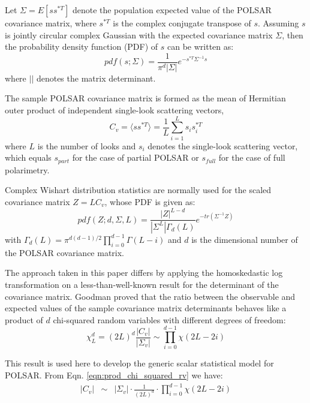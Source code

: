 \documentclass[journal]{IEEEtran}
\begin{document}
Let $\Sigma=E [ss^{*T}]$ denote the population expected value of the POLSAR covariance matrix,
  where $s^{*T}$ is the complex conjugate transpose of $s$. 
Assuming %
  $s$ is jointly circular complex Gaussian with the expected covariance matrix $\Sigma$,
  then the probability density function (PDF) of $s$ can be written as:
\begin{equation}
  pdf(s;\Sigma)=\frac{1}{\pi^d|\Sigma|} e^{-s^{*T}\Sigma^{-1}s}
\end{equation}
where $||$ denotes the matrix determinant.

The sample POLSAR covariance matrix is formed as the mean of Hermitian outer product of independent single-look scattering vectors,
\begin{equation}
  C_v = \langle ss^{*T} \rangle = \frac{1}{L} \sum^L_{i=1}s_is_i^{*T}
\end{equation}
where $L$ is the number of looks
  and $s_i$ denotes the single-look scattering vector,
  which equals $s_{part}$ for the case of partial POLSAR or
  $s_{full}$ for the case of full polarimetry.

Complex Wishart distribution statistics are normally used for the scaled covariance matrix
$Z=LC_v$, whose PDF is given as:
\begin{equation}
  pdf(Z;d,\Sigma,L)=\frac{|Z|^{L-d}}{|\Sigma^L|\Gamma_d(L)}e^{-tr(\Sigma^{-1}Z)}
\end{equation}
with $\Gamma_d(L) = \pi^{d(d-1)/2} \prod^{d-1}_{i=0}\Gamma(L-i)$
and $d$ is the dimensional number of the POLSAR covariance matrix.

The approach taken in this paper differs by applying the homoskedastic log transformation  on a less-than-well-known result for the determinant of the covariance matrix.
Goodman \cite{Goodman_1963_AMS_178} proved
that the ratio between the observable and expected values of the sample covariance matrix determinants
  behaves like a product of $d$ chi-squared random variables with different degrees of freedom: 
\begin{equation}
\chi^d_L = (2L)^d \frac{|C_v|}{|\Sigma_v|} \sim \prod_{i=0}^{d-1} \chi (2L-2i)
\label{eqn:prod_chi_squared_rv}  
\end{equation}

This result is used here to develop the generic scalar statistical model for POLSAR. %
From Eqn. \ref{eqn:prod_chi_squared_rv} %
we have: %
\begin{eqnarray}
  |C_v| &\sim& |\Sigma_v| \cdot \frac{1}{(2L)^d} \cdot \prod_{i=0}^{d-1} \chi (2L-2i) \label{eqn:determinant_distribution} %
\end{eqnarray}
\end{document}
